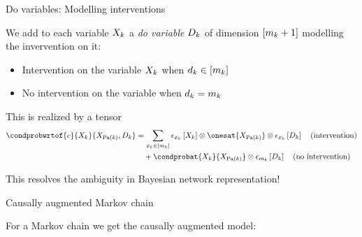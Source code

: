 \documentclass{beamer}
\begin{document}
    \begin{frame}{Do variables: Modelling interventions}

        We add to each variable $X_{k}$ a \emph{do variable $D_{k}$} of dimension $[m_{k}+1]$ modelling the invervention on it:
        \begin{itemize}
            \item Intervention on the variable $X_{k}$ when $d_{k}\in[m_{k}]$
            \item No intervention on the variable when $d_{k}=m_{k}$
        \end{itemize}

        This is realized by a tensor
        \begin{align*}
            \condprobwrtof{\causalsymbol}{\catvariableof{\catenumerator}}{\catvariableof{\parentsof{\catenumerator}},\dovariableof{\catenumerator}}
            &= \sum_{\catindexofin{\catenumerator}} \onehotmapofat{\catindexof{\catenumerator}}{\catvariableof{\catenumerator}}
            \otimes \onesat{\catvariableof{\parentsof{\catenumerator}}}
            \otimes  \onehotmapofat{\catindexof{\catenumerator}}{\dovariableof{\catenumerator}} \quad \text{(intervention)} \\
            & \quad + \condprobat{\catvariableof{\catenumerator}}{\catvariableof{\parentsof{\catenumerator}}}
            \otimes \onehotmapofat{\catdimof{\catenumerator}}{\dovariableof{\catenumerator}} \quad \text{(no intervention)}
        \end{align*}

        This resolves the ambiguity in Bayesian network representation!

    \end{frame}


    \begin{frame}{Causally augmented Markov chain}

        For a Markov chain we get the causally augmented model:
        

    \end{frame}
\end{document}
